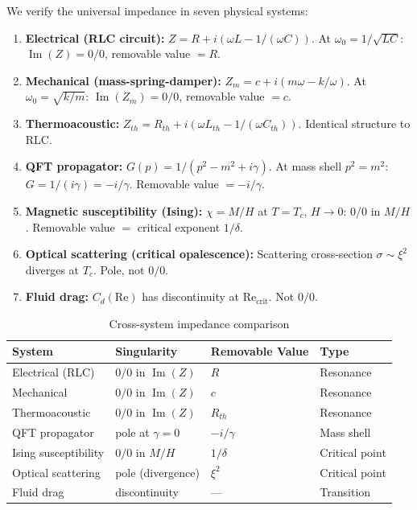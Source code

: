 \documentclass[11pt]{article}
\begin{document}
We verify the universal impedance in seven physical systems:

\begin{enumerate}
    \item \textbf{Electrical (RLC circuit):}
    $Z = R + i(\omega L - 1/(\omega C))$. At $\omega_0 = 1/\sqrt{LC}$:
    $\operatorname{Im}(Z) = 0/0$, removable value $= R$.

    \item \textbf{Mechanical (mass-spring-damper):}
    $Z_m = c + i(m\omega - k/\omega)$. At $\omega_0 = \sqrt{k/m}$:
    $\operatorname{Im}(Z_m) = 0/0$, removable value $= c$.

    \item \textbf{Thermoacoustic:}
    $Z_{th} = R_{th} + i(\omega L_{th} - 1/(\omega C_{th}))$. Identical structure to RLC.

    \item \textbf{QFT propagator:}
    $G(p) = 1/(p^2 - m^2 + i\gamma)$. At mass shell $p^2 = m^2$:
    $G = 1/(i\gamma) = -i/\gamma$. Removable value $= -i/\gamma$.

    \item \textbf{Magnetic susceptibility (Ising):}
    $\chi = M/H$ at $T = T_c$, $H \to 0$: $0/0$ in $M/H$. Removable value $= $ critical exponent $1/\delta$.

    \item \textbf{Optical scattering (critical opalescence):}
    Scattering cross-section $\sigma \sim \xi^2$ diverges at $T_c$. Pole, not $0/0$.

    \item \textbf{Fluid drag:}
    $C_d(\mathrm{Re})$ has discontinuity at $\mathrm{Re}_{\text{crit}}$. Not $0/0$.
\end{enumerate}

\begin{table}[h]
\centering
\caption{Cross-system impedance comparison}
\begin{tabular}{@{}llll@{}}
\toprule
System & Singularity & Removable Value & Type \\
\midrule
Electrical (RLC) & $0/0$ in $\operatorname{Im}(Z)$ & $R$ & Resonance \\
Mechanical & $0/0$ in $\operatorname{Im}(Z)$ & $c$ & Resonance \\
Thermoacoustic & $0/0$ in $\operatorname{Im}(Z)$ & $R_{th}$ & Resonance \\
QFT propagator & pole at $\gamma=0$ & $-i/\gamma$ & Mass shell \\
Ising susceptibility & $0/0$ in $M/H$ & $1/\delta$ & Critical point \\
Optical scattering & pole (divergence) & $\xi^2$ & Critical point \\
Fluid drag & discontinuity & --- & Transition \\
\bottomrule
\end{tabular}
\end{table}
\end{document}

